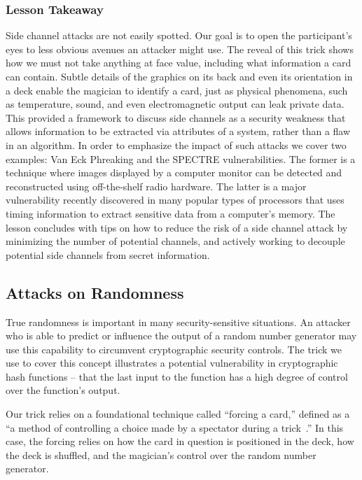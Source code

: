 %

\subsubsection{Lesson Takeaway}

Side channel attacks are not easily spotted.  Our goal is to
open the participant's eyes to less
obvious avenues an attacker might use.
The reveal of this trick shows how we must not
take anything at face value, including what information
a card can contain.
Subtle details of the graphics on its back and even its orientation in a
deck enable the magician to identify a card, just as physical phenomena,
such as temperature, sound, and even electromagnetic output can
leak private data.
This provided a framework
to discuss side channels
as a security weakness that allows information to
be extracted via attributes
of a system, rather than a flaw in an
algorithm.
In order to emphasize the impact of such attacks we cover two examples: Van
Eck Phreaking and the SPECTRE vulnerabilities.
The former is a technique where images displayed by a computer monitor can be
detected and reconstructed using off-the-shelf radio hardware.
The latter is a major vulnerability recently discovered in many popular
types of
processors that uses timing information to extract sensitive data from a
computer's memory.
The lesson concludes with tips on how to
reduce the risk of a side channel attack
by minimizing the number of potential channels,
and actively working to decouple potential
side channels from secret information.

\subsection{Attacks on Randomness}


True randomness is important in many
security-sensitive situations.
An attacker who is able to predict or influence the output of a random number
generator may use this capability to circumvent cryptographic security controls.
The trick we use to cover this concept
illustrates a potential vulnerability in cryptographic hash functions
-- that the last input to the function has a high degree of control over
the function's output.

Our trick relies on a foundational technique called ``forcing a card,''
defined as a ``a method of controlling a choice made by a spectator during
a trick~\cite{forcingcard}.''
In this case, the forcing relies on how the card in question is positioned
in the deck, how the deck is shuffled, and the magician's control over the
random number generator.

